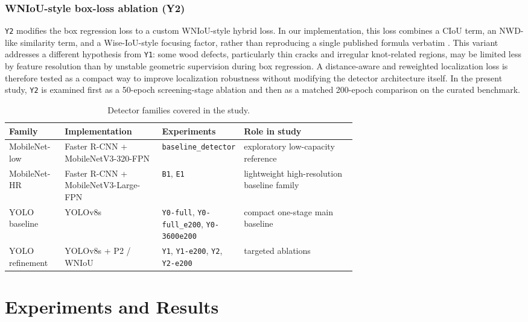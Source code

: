 \documentclass[10pt,a4paper]{article}
\begin{document}
\subsubsection{WNIoU-style box-loss ablation (Y2)}
\texttt{Y2} modifies the box regression loss to a custom WNIoU-style hybrid loss. In our implementation, this loss combines a CIoU term, an NWD-like similarity term, and a Wise-IoU-style focusing factor, rather than reproducing a single published formula verbatim \citep{tong_2023_wiseiou,wang_2021_nwd,zheng_2020_diou}. This variant addresses a different hypothesis from \texttt{Y1}: some wood defects, particularly thin cracks and irregular knot-related regions, may be limited less by feature resolution than by unstable geometric supervision during box regression. A distance-aware and reweighted localization loss is therefore tested as a compact way to improve localization robustness without modifying the detector architecture itself. In the present study, \texttt{Y2} is examined first as a 50-epoch screening-stage ablation and then as a matched 200-epoch comparison on the curated benchmark.


\begin{table}[t]
  \centering
  \caption{Detector families covered in the study.}
  \label{tab:detector-families}
  \footnotesize
  \setlength{\tabcolsep}{4pt}
  \begin{tabularx}{\linewidth}{>{\raggedright\arraybackslash}p{0.16\linewidth} >{\raggedright\arraybackslash}p{0.28\linewidth} >{\raggedright\arraybackslash}p{0.23\linewidth} X}
    \toprule
    Family & Implementation & Experiments & Role in study \\
    \midrule
    MobileNet-low & Faster R-CNN + MobileNetV3-320-FPN & \texttt{baseline\_detector} & exploratory low-capacity reference \\
    MobileNet-HR & Faster R-CNN + MobileNetV3-Large-FPN & \texttt{B1}, \texttt{E1} & lightweight high-resolution baseline family \\
    YOLO baseline & YOLOv8s & \texttt{Y0-full}, \texttt{Y0-full\_e200}, \texttt{Y0-3600e200} & compact one-stage main baseline \\
    YOLO refinement & YOLOv8s + P2 / WNIoU & \texttt{Y1}, \texttt{Y1-e200}, \texttt{Y2}, \texttt{Y2-e200} & targeted ablations \\
    \bottomrule
  \end{tabularx}
\end{table}



\section{Experiments and Results}
\label{sec:experiments}
\end{document}
